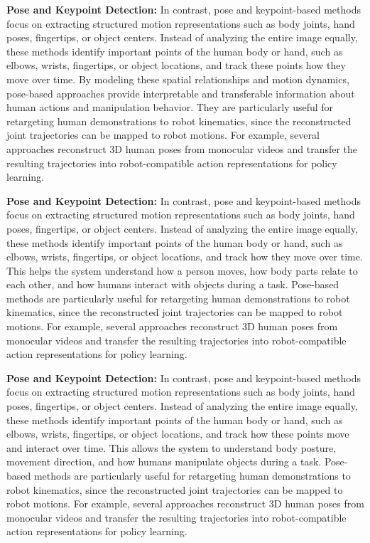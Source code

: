 \textbf{Pose and Keypoint Detection:} In contrast, pose and keypoint-based methods focus on extracting structured motion representations such as body joints, hand poses, fingertips, or object centers. Instead of analyzing the entire image equally, these methods identify important points of the human body or hand, such as elbows, wrists, fingertips, or object locations, and track these points how they move over time. By modeling these spatial relationships and motion dynamics, pose-based approaches provide interpretable and transferable information about human actions and manipulation behavior. They are particularly useful for retargeting human demonstrations to robot kinematics, since the reconstructed joint trajectories can be mapped to robot motions. For example, several approaches reconstruct 3D human poses from monocular videos and transfer the resulting trajectories into robot-compatible action representations for policy learning.


\textbf{Pose and Keypoint Detection:} In contrast, pose and keypoint-based methods focus on extracting structured motion representations such as body joints, hand poses, fingertips, or object centers. Instead of analyzing the entire image equally, these methods identify important points of the human body or hand, such as elbows, wrists, fingertips, or object locations, and track how they move over time. This helps the system understand how a person moves, how body parts relate to each other, and how humans interact with objects during a task. Pose-based methods are particularly useful for retargeting human demonstrations to robot kinematics, since the reconstructed joint trajectories can be mapped to robot motions. For example, several approaches reconstruct 3D human poses from monocular videos and transfer the resulting trajectories into robot-compatible action representations for policy learning.


\textbf{Pose and Keypoint Detection:} In contrast, pose and keypoint-based methods focus on extracting structured motion representations such as body joints, hand poses, fingertips, or object centers. Instead of analyzing the entire image equally, these methods identify important points of the human body or hand, such as elbows, wrists, fingertips, or object locations, and track how these points move and interact over time. This allows the system to understand body posture, movement direction, and how humans manipulate objects during a task. Pose-based methods are particularly useful for retargeting human demonstrations to robot kinematics, since the reconstructed joint trajectories can be mapped to robot motions. For example, several approaches reconstruct 3D human poses from monocular videos and transfer the resulting trajectories into robot-compatible action representations for policy learning.









